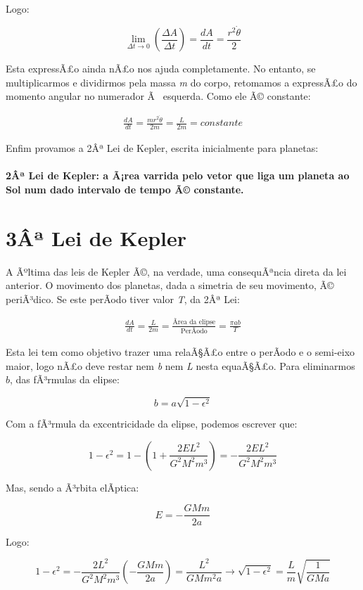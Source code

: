 Logo:

\[
	\lim_{\Delta t \rightarrow 0}\left({\frac{\Delta A}{\Delta t}}\right) = \frac{dA}{dt} = \frac{r^2\dot{\theta}}{2}
\]

Esta expressÃ£o ainda nÃ£o nos ajuda completamente. No entanto, se multiplicarmos e dividirmos pela massa \textit{m} do corpo, retomamos a expressÃ£o do momento angular no numerador Ã  esquerda. Como ele Ã© constante:

\begin{eqnarray}
	\frac{dA}{dt} = \frac{mr^2\dot{\theta}}{2m} = \frac{L}{2m} = constante \label{eq55}
\end{eqnarray}

Enfim provamos a 2Âª Lei de Kepler, escrita inicialmente para planetas:{\\}{\\}
\textbf{\Large{2Âª Lei de Kepler: a Ã¡rea varrida pelo vetor que liga um planeta ao Sol num dado intervalo de tempo Ã© constante.}} {\\}

\section{3Âª Lei de Kepler}

A Ãºltima das leis de Kepler Ã©, na verdade, uma consequÃªncia direta da lei anterior. O movimento dos planetas, dada a simetria de seu movimento, Ã© periÃ³dico. Se este perÃ­odo tiver valor \textit{T}, da 2Âª Lei:

\begin{eqnarray}
	\frac{dA}{dt} = \frac{L}{2m} = \frac{\text{Ãrea da elipse}}{\text{PerÃ­odo}} = \frac{\pi ab}{T} \label{eq56}
\end{eqnarray}

Esta lei tem como objetivo trazer uma relaÃ§Ã£o entre o perÃ­odo e o semi-eixo maior, logo nÃ£o deve restar nem \textit{b} nem \textit{L} nesta equaÃ§Ã£o. Para eliminarmos $b$, das fÃ³rmulas da elipse:

\[
	b = a\sqrt{1 - \epsilon^2}
\]

Com a fÃ³rmula da excentricidade da elipse, podemos escrever que:

\[
	1 - \epsilon^2 = 1 - \left(1 + \frac{2EL^2}{G^2M^2m^3}\right) = - \frac{2EL^2}{G^2M^2m^3}
\]

Mas, sendo a Ã³rbita elÃ­ptica:

\[
	E = -\frac{GMm}{2a}
\]

Logo:

\[
	1 - \epsilon^2 = -\frac{2L^2}{G^2M^2m^3}\left(-\frac{GMm}{2a}\right) = \frac{L^2}{GMm^2a} \rightarrow \sqrt{1-\epsilon^2} = \frac{L}{m}\sqrt{\frac{1}{GMa}}
\]{\\}

